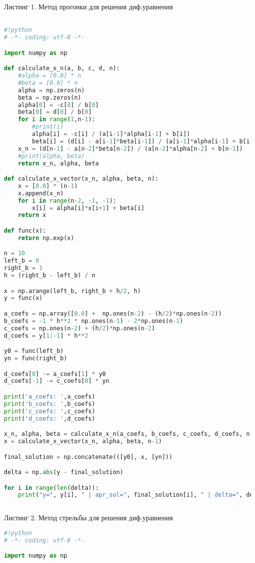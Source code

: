 \documentclass [12pt]{article}
\begin{document}
Листинг 1. Метод прогонки для решения диф.уравнения
\begin{lstlisting}[language=python]

#!python
# -*- coding: utf-8 -*-

import numpy as np

def calculate_x_n(a, b, c, d, n):
    #alpha = [0.0] * n
    #beta = [0.0] * n
    alpha = np.zeros(n)
    beta = np.zeros(n)    
    alpha[0] = -c[0] / b[0]
    beta[0] = d[0] / b[0]
    for i in range(1,n-1):
        #print(i)
        alpha[i] = -c[i] / (a[i-1]*alpha[i-1] + b[i])
        beta[i] = (d[i] - a[i-1]*beta[i-1]) / (a[i-1]*alpha[i-1] + b[i])
    x_n = (d[n-1] - a[n-2]*beta[n-2]) / (a[n-2]*alpha[n-2] + b[n-1])
    #print(alpha, beta)
    return x_n, alpha, beta

def calculate_x_vector(x_n, alpha, beta, n):
    x = [0.0] * (n-1)
    x.append(x_n)
    for i in range(n-2, -1, -1):
        x[i] = alpha[i]*x[i+1] + beta[i]
    return x

def func(x):
    return np.exp(x)

n = 10
left_b = 0
right_b = 1
h = (right_b - left_b) / n

x = np.arange(left_b, right_b + h/2, h)
y = func(x)

a_coefs = np.array([0.0] +  np.ones(n-2) - (h/2)*np.ones(n-2))
b_coefs = -1 * h**2 * np.ones(n-1) - 2*np.ones(n-1)
c_coefs = np.ones(n-2) + (h/2)*np.ones(n-2)
d_coefs = y[1:-1] * h**2 

y0 = func(left_b)
yn = func(right_b)

d_coefs[0] -= a_coefs[1] * y0
d_coefs[-1] -= c_coefs[0] * yn

print('a_coefs: ',a_coefs)
print('b_coefs: ',b_coefs)
print('c_coefs: ',c_coefs)
print('d_coefs: ',d_coefs)

x_n, alpha, beta = calculate_x_n(a_coefs, b_coefs, c_coefs, d_coefs, n-1)
x = calculate_x_vector(x_n, alpha, beta, n-1)

final_solution = np.concatenate(([y0], x, [yn]))

delta = np.abs(y - final_solution)

for i in range(len(delta)):
    print("y=", y[i], " | apr_sol=", final_solution[i], " | delta=", delta[i])
    
\end{lstlisting}

Листинг 2. Метод стрельбы для решения диф.уравнения

\begin{lstlisting}[language=python]
#!python
# -*- coding: utf-8 -*-

import numpy as np
\end{lstlisting}
\end{document}
